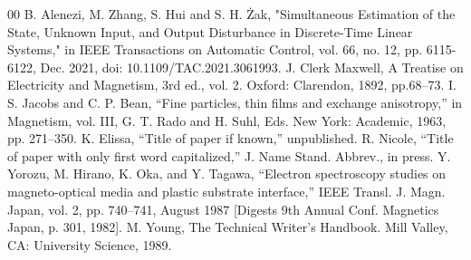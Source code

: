\documentclass[conference]{IEEEtran}
\begin{document}



\begin{thebibliography}{00}
 B. Alenezi, M. Zhang, S. Hui and S. H. Żak, "Simultaneous Estimation of the State, Unknown Input, and Output Disturbance in Discrete-Time Linear Systems," in IEEE Transactions on Automatic Control, vol. 66, no. 12, pp. 6115-6122, Dec. 2021, doi: 10.1109/TAC.2021.3061993.
 J. Clerk Maxwell, A Treatise on Electricity and Magnetism, 3rd ed., vol. 2. Oxford: Clarendon, 1892, pp.68--73.
 I. S. Jacobs and C. P. Bean, ``Fine particles, thin films and exchange anisotropy,'' in Magnetism, vol. III, G. T. Rado and H. Suhl, Eds. New York: Academic, 1963, pp. 271--350.
 K. Elissa, ``Title of paper if known,'' unpublished.
 R. Nicole, ``Title of paper with only first word capitalized,'' J. Name Stand. Abbrev., in press.
 Y. Yorozu, M. Hirano, K. Oka, and Y. Tagawa, ``Electron spectroscopy studies on magneto-optical media and plastic substrate interface,'' IEEE Transl. J. Magn. Japan, vol. 2, pp. 740--741, August 1987 [Digests 9th Annual Conf. Magnetics Japan, p. 301, 1982].
 M. Young, The Technical Writer's Handbook. Mill Valley, CA: University Science, 1989.
\end{thebibliography}
\end{document}
